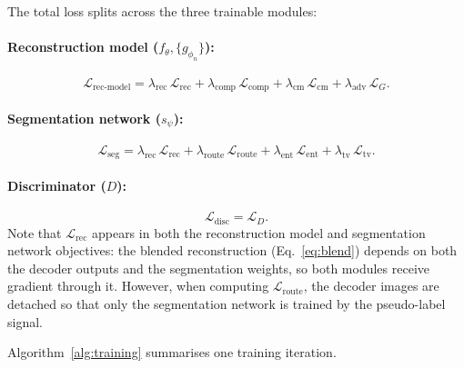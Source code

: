 \documentclass{article}
\begin{document}
The total loss splits across the three trainable modules:

\paragraph{Reconstruction model ($f_\theta, \{g_{\phi_n}\}$):}
\begin{equation}
  \mathcal{L}_\text{rec-model} =
    \lambda_\mathrm{rec}\, \mathcal{L}_\mathrm{rec}
    + \lambda_\mathrm{comp}\, \mathcal{L}_\mathrm{comp}
    + \lambda_\mathrm{cm}\,  \mathcal{L}_\mathrm{cm}
    + \lambda_\mathrm{adv}\, \mathcal{L}_G.
\end{equation}

\paragraph{Segmentation network ($s_\psi$):}
\begin{equation}
  \mathcal{L}_\text{seg} =
    \lambda_\mathrm{rec}\, \mathcal{L}_\mathrm{rec}
    + \lambda_\mathrm{route}\, \mathcal{L}_\mathrm{route}
    + \lambda_\mathrm{ent}\, \mathcal{L}_\mathrm{ent}
    + \lambda_\mathrm{tv}\, \mathcal{L}_\mathrm{tv}.
\end{equation}

\paragraph{Discriminator ($D$):}
\begin{equation}
  \mathcal{L}_\text{disc} = \mathcal{L}_D.
\end{equation}
Note that $\mathcal{L}_\mathrm{rec}$ appears in both the reconstruction model and
segmentation network objectives: the blended reconstruction (Eq.~\ref{eq:blend})
depends on both the decoder outputs and the segmentation weights, so both modules
receive gradient through it.  However, when computing $\mathcal{L}_\mathrm{route}$,
the decoder images are detached so that only the segmentation network is trained
by the pseudo-label signal.

Algorithm~\ref{alg:training} summarises one training iteration.
\end{document}
